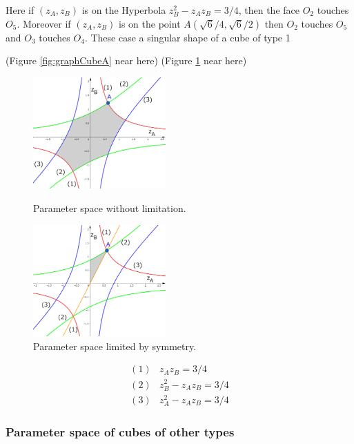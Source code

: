 \documentclass[suppldata, dvipdfmx]{interact}
\theoremstyle{plain}%
\theoremstyle{definition}
\theoremstyle{remark}
\theoremstyle{problemstyle}
\begin{document}
Here if $(z_A, z_B)$ is on the Hyperbola $z_B^2 - z_A z_B = 3/4$, then the face $O_2$ touches $O_5$.  Moreover if $(z_A, z_B)$ is on the point $A(\sqrt{6}/4, \sqrt{6}/2)$ then $O_2$ touches $O_5$ and $O_3$ touches $O_4$.  These case a  singular shape of a cube of type 1

\noindent(Figure \ref{fig:graphCubeA} near here)
(Figure \ref{fig:graphCubeALimit} near here)
\begin{figure}[h!tbp]
 \begin{minipage}[t]{0.5\textwidth}
 \centering
 \includegraphics[width=2in,
 keepaspectratio]{./img/graph/cubeA.jpg}
 \caption{Parameter space without limitation.}
 \label{fig:graphCubeA}
 \end{minipage}
 \hspace*{\fill}
 \begin{minipage}[t]{0.5\textwidth}
  \centering
  \includegraphics[width=2in,
  keepaspectratio]{./img/graph/cubeALimit.jpg}
  \caption{Parameter space limited by symmetry.}
  \label{fig:graphCubeALimit}
 \end{minipage}
 \hspace*{\fill}
\end{figure}
\begin{align*}
(1)& z_Az_B = 3/4\\
(2)& z_B^2 - z_A z_B = 3/4\\
(3)& z_A^2 - z_A z_B = 3/4
\end{align*}

\subsubsection{Parameter space of cubes of other types}
\end{document}
